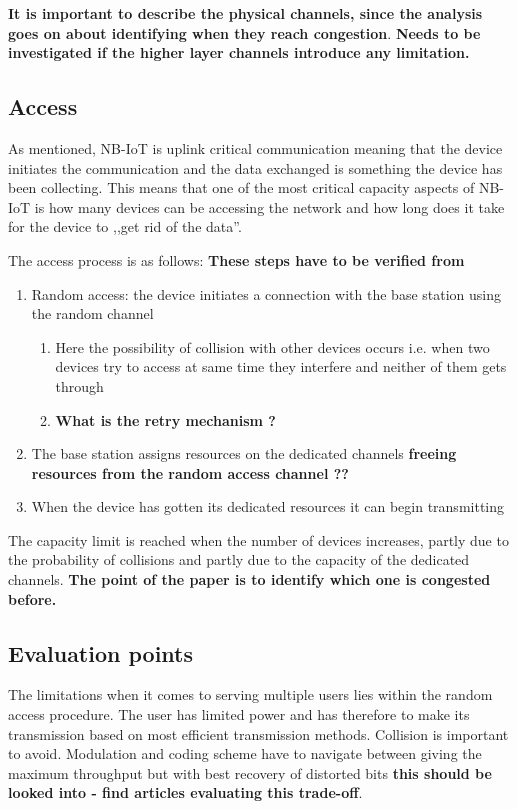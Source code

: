 \documentclass[10pt,a4paper,titlepage,twoside]{article}
\newcommand{\hghlght}[1]{\textbf{\color{ymaorng} #1}}
\newcommand{\point}[1]{\textbf{\color{ymared} #1}}
\begin{document}
\hghlght{It is important to describe the physical channels, since the analysis goes on about identifying when they reach congestion}. \point{Needs to be investigated if the higher layer channels introduce any limitation.}

\subsection{Access}

As mentioned, NB-IoT is uplink critical communication meaning that the device initiates the communication and the data exchanged is something the device has been collecting. This means that one of the most critical capacity aspects of NB-IoT is how many devices can be accessing the network and how long does it take for the device to ,,get rid of the data''.

The access process is as follows: \hghlght{These steps have to be verified from \cite{3gpp}}
\begin{enumerate}
  \item Random access: the device initiates a connection with the base station using the random channel
  \begin{enumerate}
    \item Here the possibility of collision with other devices occurs i.e. when two devices try to access at same time they interfere and neither of them gets through
    \item \hghlght{What is the retry mechanism ?}
  \end{enumerate}
  \item The base station assigns resources on the dedicated channels \point{freeing resources from the random access channel ??}
  \item When the device has gotten its dedicated resources it can begin transmitting
\end{enumerate}

The capacity limit is reached when the number of devices increases, partly due to the probability of collisions and partly due to the capacity of the dedicated channels. \hghlght{The point of the paper is to identify which one is congested before.}


\subsection{Evaluation points}

The limitations when it comes to serving multiple users lies within the random access procedure. The user has limited power and has therefore to make its transmission based on most efficient transmission methods. Collision is important to avoid. Modulation and coding scheme have to navigate between giving the maximum throughput but with best recovery of distorted bits \point{this should be looked into - find articles evaluating this trade-off}.
\end{document}
